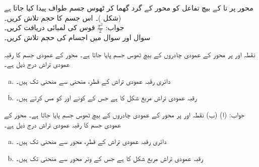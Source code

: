 محور  پر  تا  کے بیچ تفاعل  کو محور  کے گرد گھما کر ٹھوس جسم طواف پیدا کیا جاتا ہے (شکل )۔ اس جسم کا حجم تلاش کریں۔\\
جواب:\quad
$\tfrac{\pi^2}{2}$ 
قوس  کی لمبائی دریافت کریں۔
\\
سوال  اور سوال  میں اجسام کی حجم تلاش کریں۔

نقطہ  اور  پر محور  کے عمودی چادروں کے بیچ ٹھوس جسم پایا جاتا ہے۔ محور  کے عمودی جسم کا رقبہ عمودی تراش درج ذیل ہے۔
\begin{enumerate}[a.]
\item
دائری رقبہ عمودی تراش کے قطر،  منحنی  سے منحنی  تک ہیں۔
\item
رقبہ عمودی تراش مربع شکل کا ہے جس کے کونے  اور  کو مس کرتے ہیں۔
\end{enumerate}
جواب:\quad
(ا)  (ب) 
نقطہ  اور  پر محور  کے عمودی چادروں کے بیچ ٹھوس جسم پایا جاتا ہے۔ محور  کے عمودی جسم کا رقبہ عمودی تراش درج ذیل ہے۔
\begin{enumerate}[a.]
\item
دائری رقبہ عمودی تراش کے قطر،  محور  سے منحنی  تک  ہیں۔
\item
رقبہ عمودی تراش مربع شکل کا ہے جس کے وتر  محور   سے منحنی   تک ہیں۔
\end{enumerate}


